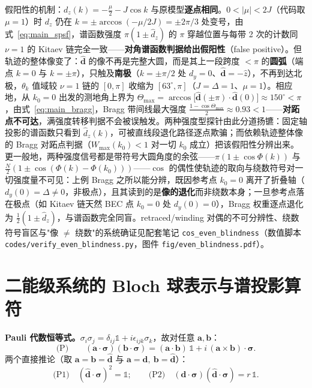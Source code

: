 \documentclass[onecolumn,aps,prl,superscriptaddress,longbibliography]{revtex4-2}
\begin{document}
假阳性的机制：$d_z(k) = -\tfrac{\mu}{2} - J\cos k$ 与原模型\textbf{逐点相同}。$0 < |\mu| < 2J$（代码取 $\mu = 1$）时 $d_z$ 仍在 $k = \pm\arccos(-\mu/2J) = \pm 2\pi/3$ 处变号，由式~\eqref{eq:main_spsf}，谱函数强度 $\pi(1\pm\hat d_z)$ 的 $\pi$ 穿越位置与每带 2 次的计数同 $\nu = 1$ 的 Kitaev 链完全一致——\textbf{对角谱函数判据给出假阳性}（false positive）。但轨迹的整体像变了：$\hat{\mathbf{d}}$ 的像不再是完整大圆，而是其上一段跨度 $<\pi$ 的\textbf{圆弧}（端点 $k = 0$ 与 $k = \pm\pi$），只触及\textbf{南极}（$k = \pm\pi/2$ 处 $d_y = 0$、$\hat{\mathbf{d}} = -\hat z$），不再到达北极，$\theta_k$ 值域较 $\nu = 1$ 链的 $[0,\pi]$ 收缩为 $[63^\circ,\pi]$（$J = \Delta = 1$、$\mu = 1$）。相应地，从 $k_0 = 0$ 出发的测地角上界为 $\Theta_{\max} = \arccos\big[\hat{\mathbf{d}}(\pm\pi)\cdot\hat{\mathbf{d}}(0)\big] \approx 150^\circ < \pi$，由式~\eqref{eq:main_bragg}，Bragg 带间线最大强度 $\tfrac{1-\cos\Theta_{\max}}{2} \approx 0.93 < 1$——\textbf{对跖点不可达}，满强度转移判据不会被误触发。两种强度型探针由此分道扬镳：固定轴投影的谱函数只看到 $\hat d_z(k)$，可被直线段退化路径逐点欺骗；而依赖轨迹整体像的 Bragg 对跖点判据（$W_{\max}(k_0) < 1$ 对一切 $k_0$ 成立）把该假阳性分辨出来。更一般地，两种强度信号都是带符号大圆角度的余弦——$\pi(1\pm\cos\Phi(k))$ 与 $\tfrac{N}{2}(1\pm\cos(\Phi(k)-\Phi(k_0)))$——$\cos$ 的偶性使轨迹的取向与绕数符号对一切强度量不可见：上例 Bragg 之所以能分辨，既因参考点 $k_0=0$ 离开了折叠轴（$d_y(0)=\Delta\neq0$，非极点），且其读到的是\textbf{像的退化}而非绕数本身；一旦参考点落在极点（如 Kitaev 链天然 BEC 点 $k_0=0$ 处 $d_y(0)=0$），Bragg 权重逐点退化为 $\tfrac{1}{2}(1\pm\hat d_z)$，与谱函数完全同盲。retraced/winding 对偶的不可分辨性、绕数符号盲区与"像 $\neq$ 绕数"的系统确证见配套笔记 \texttt{cos\_even\_blindness}（数值脚本 \texttt{codes/verify\_even\_blindness.py}，图件 \texttt{fig/even\_blindness.pdf}）。

\appendix
\section{二能级系统的 Bloch 球表示与谱投影算符}\label{app:prelim}

\textbf{Pauli 代数恒等式。}$\sigma_i\sigma_j = \delta_{ij}\mathbb{1} + i\epsilon_{ijk}\sigma_k$，故对任意 $\mathbf{a},\mathbf{b}$：
\begin{equation}\label{eq:pauli}
\text{(P)}\qquad (\mathbf{a}\cdot\symbf{\sigma})(\mathbf{b}\cdot\symbf{\sigma}) = (\mathbf{a}\cdot\mathbf{b})\,\mathbb{1} + i\,(\mathbf{a}\times\mathbf{b})\cdot\symbf{\sigma}.
\end{equation}
两个直接推论（取 $\mathbf{a} = \mathbf{b} = \hat{\mathbf{d}}$ 与 $\mathbf{a} = \mathbf{d},\ \mathbf{b} = \hat{\mathbf{d}}$）：
\begin{equation}
\text{(P1)}\quad (\hat{\mathbf{d}}\cdot\symbf{\sigma})^2 = \mathbb{1};\qquad
\text{(P2)}\quad (\mathbf{d}\cdot\symbf{\sigma})(\hat{\mathbf{d}}\cdot\symbf{\sigma}) = r\,\mathbb{1}.
\end{equation}
\end{document}
